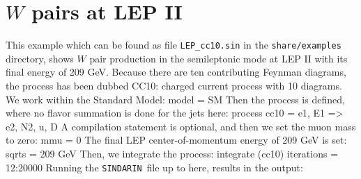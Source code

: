 \documentclass[12pt]{book}
\newenvironment{code}%
  {\begingroup\footnotesize
   \quote
   \Verbatim}%
  {\endVerbatim
   \endquote
   \endgroup\noindent}
\newcommand{\ttt}[1]{\texttt{#1}}
\newcommand{\sindarin}{\ttt{SINDARIN}}
\begin{document}

\section{$W$ pairs at LEP II}

This example which can be found as file \ttt{LEP\_cc10.sin} in the
\ttt{share/examples} directory, shows $W$ pair production in the
semileptonic mode at LEP II with its final energy of 209 GeV. Because
there are ten contributing Feynman diagrams, the process has been
dubbed CC10: charged current process with 10 diagrams. We work within
the Standard Model:
\begin{code}
  model = SM
\end{code}
Then the process is defined, where no flavor summation is done for the
jets here:
\begin{code}
  process cc10 = e1, E1 => e2, N2, u, D
\end{code}
A compilation statement is optional, and then we set the muon mass to
zero:
\begin{code}
  mmu = 0
\end{code}
The final LEP center-of-momentum energy of 209 GeV is set:
\begin{code}
  sqrts = 209 GeV
\end{code}
Then, we integrate the process:
\begin{code}
  integrate (cc10) { iterations = 12:20000 }
\end{code}
Running the \sindarin\ file up to here, results in the output:
\end{document}
